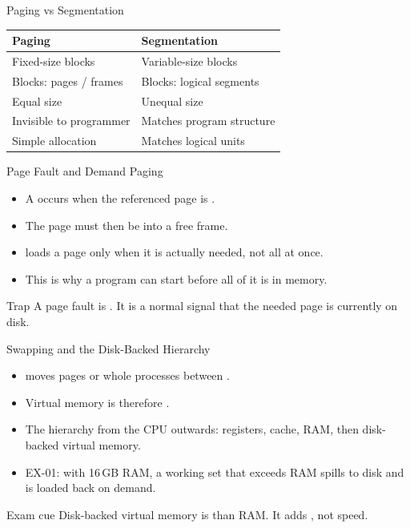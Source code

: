 \documentclass[aspectratio=169]{beamer}
\begin{document}
\begin{frame}{Paging vs Segmentation}
  \begin{center}
    \begin{tabular}{ll}
      \toprule
      \textbf{Paging} & \textbf{Segmentation} \\
      \midrule
      Fixed-size blocks & Variable-size blocks \\
      Blocks: pages / frames & Blocks: logical segments \\
      Equal size & Unequal size \\
      Invisible to programmer & Matches program structure \\
      Simple allocation & Matches logical units \\
      \bottomrule
    \end{tabular}
  \end{center}
  \vspace{0.3cm}
\end{frame}

\begin{frame}{Page Fault and Demand Paging}
  \begin{itemize}
    \item A  occurs when the referenced page is
      .
    \item The page must then be  into a free frame.
    \item {} loads a page only when it is actually needed,
      not all at once.
    \item This is why a program can start before all of it is in memory.
  \end{itemize}
  \begin{alertblock}{Trap}
    A page fault is . It is a normal signal that
    the needed page is currently on disk.
  \end{alertblock}
\end{frame}

\begin{frame}{Swapping and the Disk-Backed Hierarchy}
  \begin{itemize}
    \item {} moves pages or whole processes between .
    \item Virtual memory is therefore .
    \item The hierarchy from the CPU outwards: registers, cache, RAM, then
      disk-backed virtual memory.
    \item EX-01: with 16\,GB RAM, a working set that exceeds RAM spills to
      disk and is loaded back on demand.
  \end{itemize}
  \begin{block}{Exam cue}
    Disk-backed virtual memory is  than RAM. It adds
    , not speed.
  \end{block}
\end{frame}
\end{document}
